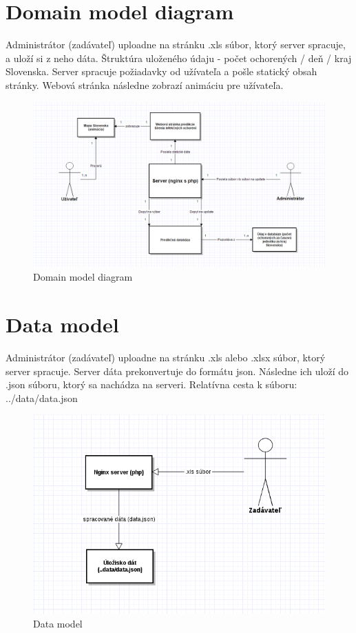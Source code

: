 \documentclass[12pt,a4paper]{report}
\begin{document}
\section[Domain model diagram]{\rmfamily\bfseries
	Domain model diagram}
Administrátor (zadávateľ) uploadne na stránku .xls súbor, ktorý server spracuje, a uloží si z neho dáta. Štruktúra uloženého údaju - počet ochorených / deň / kraj Slovenska. Server spracuje požiadavky od užívateľa a pošle statický obsah stránky. Webová stránka následne zobrazí animáciu pre užívateľa.
\begin{figure}[htb]
\includegraphics[scale=0.5]{Domain_model_diagram}
\caption[Domain model diagram]{Domain model diagram}
 \label{fig:Domain model diagram}
\end{figure}

\section[Data model]{\rmfamily\bfseries
	Data model}
Administrátor (zadávateľ) uploadne na stránku .xls alebo .xlsx súbor, ktorý server spracuje. Server dáta prekonvertuje do formátu json. Následne ich uloží do .json súboru, ktorý sa nachádza na serveri. Relatívna cesta k súboru: ../data/data.json
\begin{figure}[htb]
	\includegraphics[scale=0.5]{data_model}
	\caption[Data model]{Data model}
	\label{fig:Data model}
\end{figure}
\end{document}
